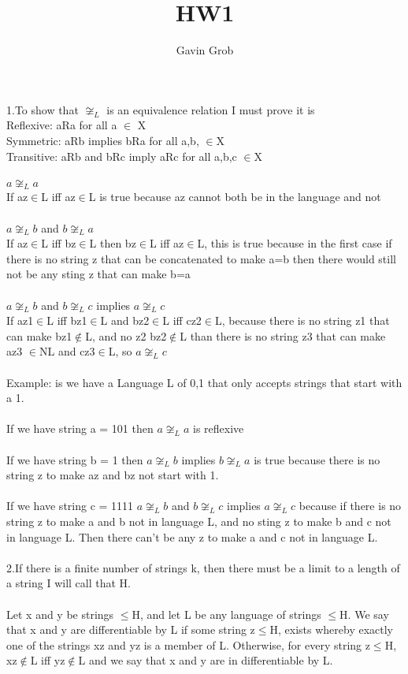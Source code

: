 \documentclass[11pt, oneside]{article}   	%
\title{HW1}
\author{Gavin Grob}
\begin{document}
1.To show that $\not\cong_L$ is an equivalence relation I must prove it is
\\Reflexive: aRa for all a $\in$ X 
\\Symmetric: aRb implies bRa for all a,b, $\in$X
\\Transitive: aRb and bRc  imply aRc for all a,b,c $\in$X
\\
\\$a \not\cong_L a$
\\If az$\in$L iff az$\in$L is true because az cannot both be in the language and not
\\
\\$a \not\cong_L b$ and $b \not\cong_L a$
\\If az$\in$L iff bz$\in$L then bz$\in$L iff az$\in$L, this is true because in the first case if there is no string z that can be concatenated to make a=b then there would still not be any sting z that can make b=a
\\
\\$a \not\cong_L b$ and $b \not\cong_L c$ implies $a \not\cong_L c$
\\If az1$\in$L iff bz1$\in$L and bz2$\in$L iff cz2$\in$L, because there is no string z1 that can make bz1$\notin$L, and no z2 bz2$\notin$L than there is no string z3 that can make az3 $\in$NL and cz3$\in$L, so $a \not\cong_L c$
\\
\\Example: is we have a Language L of {0,1} that only accepts strings that start with a 1.
\\
\\If we have string a = 101 then $a \not\cong_L a$ is reflexive
\\
\\If we have string b = 1 then $a \not\cong_L b$ implies $b \not\cong_L a$ is true because there is no string z to make az and bz not start with 1.
\\
\\If we have string c = 1111 $a \not\cong_L b$ and $b \not\cong_L c$ implies $a \not\cong_L c$ because if there is no string z to make a and b not in language L, and no sting z to make b and c not in language L. Then there can't be any z to make a and c not in language L.
\\
\\
\indent 2.If there is a finite number of strings k, then there must be a limit to a length of a string I will call that H.
\\
\\Let x and y be strings $\leq$H, and let L be any language of strings $\leq$H. We say that x and y are differentiable by L if some string z$\leq$H, exists whereby exactly one of the strings xz and yz is a member of L. Otherwise, for every string z$\leq$H, xz$\notin$L iff yz$\notin$L and we say that x and y are in differentiable by L.

\maketitle
\end{document}

